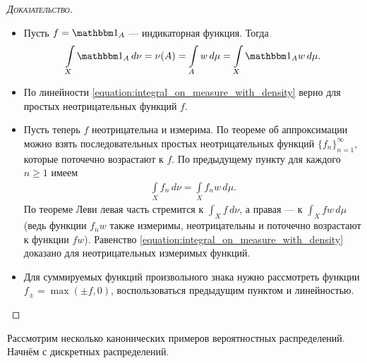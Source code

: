 \documentclass[../main.tex]{subfiles}
\begin{document}
\begin{proof}[\normalfont\textsc{Доказательство}]\
 \begin{itemize}
  \item Пусть $ f = \Ind_A $ --- индикаторная функция. Тогда
   \begin{align*}
    \int\limits_{X} \Ind_A \, d\nu = \nu(A) = \int\limits_{A} w\,d\mu = \int\limits_{X} \Ind_A w\,d\mu.    
   \end{align*} 
  \item По линейности \eqref{equation:integral_on_measure_with_density} верно для простых неотрицательных функций $ f $.
  \item Пусть теперь $ f $ неотрицательна и измерима. По теореме об аппроксимации можно взять последовательных простых неотрицательных функций $\{f_{n}\}_{n=1}^{\infty} $, которые поточечно возрастают к $ f $. По предыдущему пункту для каждого $ n \geqslant 1 $ имеем
   \begin{align*}
    \int\limits_{X} f_n \,d\nu = \int\limits_{X} f_n w \, d\mu.  
   \end{align*} По теореме Леви левая часть стремится к $ \int_{X} f\,d\nu  $, а правая --- к $ \int_{X} fw\,d\mu $ (ведь функции $ f_n w $ также измеримы, неотрицательны и поточечно возрастают к функции $ fw $). Равенство \eqref{equation:integral_on_measure_with_density} доказано для неотрицательных измеримых функций.

  \item Для суммируемых функций произвольного знака нужно рассмотреть функции $ f_\pm = \max(\pm f, 0) $, воспользоваться предыдущим пунктом и линейностью.
 \end{itemize}
\end{proof}

Рассмотрим несколько канонических примеров вероятностных распределений. Начнём с дискретных распределений.
\end{document}
